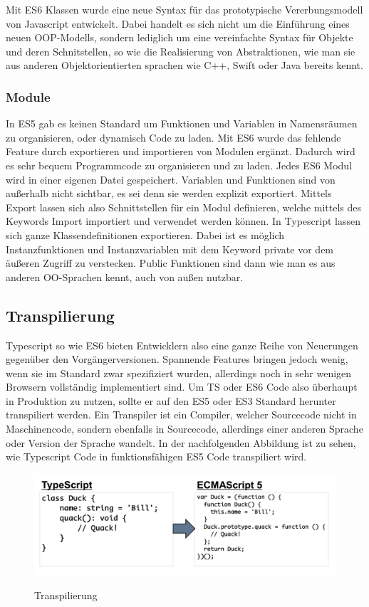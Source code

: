 Mit ES6 Klassen wurde eine neue Syntax für das prototypische Vererbungsmodell von Javascript entwickelt.
Dabei handelt es sich nicht um die Einführung eines neuen OOP-Modells, sondern lediglich um eine vereinfachte Syntax für Objekte und deren Schnitstellen,
so wie die Realisierung von Abstraktionen, wie man sie aus anderen Objektorientierten sprachen wie C++, Swift oder Java bereits kennt.\cite{js-Klassen}



\subsubsection{Module}

In ES5 gab es keinen Standard um Funktionen und Variablen in Namensräumen zu organisieren, oder dynamisch Code zu laden.
Mit ES6 wurde das fehlende Feature durch exportieren und importieren von Modulen ergänzt. Dadurch wird es sehr bequem Programmcode zu organisieren und zu laden.
Jedes ES6 Modul wird in einer eigenen Datei gespeichert. Variablen und Funktionen sind von außerhalb nicht sichtbar, es sei denn sie werden explizit exportiert.
Mittels Export lassen sich also Schnittstellen für ein Modul definieren, welche mittels des Keywords Import importiert und verwendet werden können.
In Typescript lassen sich ganze Klassendefinitionen exportieren.
Dabei ist es möglich Instanzfunktionen und Instanzvariablen mit dem Keyword private vor dem äußeren Zugriff zu verstecken.
Public Funktionen sind dann wie man es aus anderen OO-Sprachen kennt, auch von außen nutzbar.



\subsection{Transpilierung}

Typescript so wie ES6 bieten Entwicklern also eine ganze Reihe von Neuerungen gegenüber den Vorgängerversionen.
Spannende Features bringen jedoch wenig, wenn sie im Standard zwar spezifiziert wurden,
allerdings noch in sehr wenigen Browsern vollständig implementiert sind.
Um TS oder ES6 Code also überhaupt in Produktion zu nutzen, sollte er auf den ES5 oder ES3
Standard herunter transpiliert werden.
Ein Transpiler ist ein Compiler, welcher Sourcecode nicht in Maschinencode, sondern ebenfalls in Sourcecode,
allerdings einer anderen Sprache oder Version der Sprache wandelt.\cite{Introduction-to-the-Typescript-Transpiler}
In der nachfolgenden Abbildung ist zu sehen, wie Typescript Code in funktionsfähigen ES5 Code transpiliert wird.

\begin{figure}[ht]
 \centering
 \includegraphics[width=0.8\linewidth]{kapitel2/Introduction-transpiler.png}
 \caption{Transpilierung}\cite[27]{ng-Book-2}
\end{figure}
